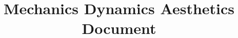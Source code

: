 \documentclass{article}
\title{\projectname Mechanics Dynamics Aesthetics Document}
\date{\docdate}
\author{\authorname}
\begin{document}
\maketitle
\newpage

\tableofcontents
\newpage







\printglossary

\glsaddall
\end{document}
